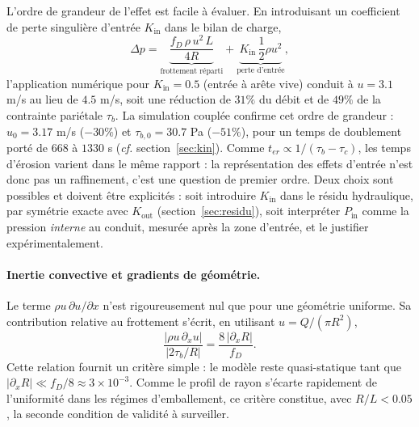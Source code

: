 \documentclass[11pt,a4paper]{report}
\newcommand{\kout}{K_{\mathrm{out}}}
\newcommand{\kin}{K_{\mathrm{in}}}
\newcommand{\ter}{{t_{er}}}
\begin{document}
L'ordre de grandeur de l'effet est facile à évaluer. En introduisant un coefficient de perte singulière
d'entrée \(\kin\) dans le bilan de charge,
\begin{equation}
\Delta p = \underbrace{\frac{f_D\,\rho\,u^2\,L}{4R}}_{\text{frottement réparti}}
+ \underbrace{\kin\,\frac{1}{2}\rho u^2}_{\text{perte d'entrée}},
\label{eq:charge-entree}
\end{equation}
l'application numérique pour \(\kin = 0.5\) (entrée à arête vive) conduit à \(u = 3.1\) m/s au lieu de
\(4.5\) m/s, soit une réduction de \(31\%\) du débit et de \(49\%\) de la contrainte pariétale
\(\tau_b\). La simulation couplée confirme cet ordre de grandeur : \(u_0 = 3.17\) m/s
(\(-30\%\)) et \(\tau_{b,0} = 30.7\) Pa (\(-51\%\)), pour un temps de doublement porté de \(668\) à
\(1330\) s (\emph{cf.} section~\ref{sec:kin}). Comme \(\ter \propto 1/(\tau_b-\tau_c)\), les temps d'érosion varient dans le même rapport :
la représentation des effets d'entrée n'est donc pas un raffinement, c'est une question de premier
ordre. Deux choix sont possibles et doivent être explicités : soit introduire \(\kin\) dans le résidu
hydraulique, par symétrie exacte avec \(\kout\) (section~\ref{sec:residu}), soit interpréter
\(P_{\mathrm{in}}\) comme la pression \emph{interne} au conduit, mesurée après la zone d'entrée, et le
justifier expérimentalement.

\paragraph{Inertie convective et gradients de géométrie.} Le terme \(\rho u\,\partial u/\partial x\)
n'est rigoureusement nul que pour une géométrie uniforme. Sa contribution relative au frottement
s'écrit, en utilisant \(u = Q/(\pi R^2)\),
\begin{equation}
\frac{\left|\rho u\,\partial_x u\right|}{\left|2\tau_b/R\right|}
= \frac{8\,|\partial_x R|}{f_D}.
\label{eq:inertie-frottement}
\end{equation}
Cette relation fournit un critère simple : le modèle reste quasi-statique tant que
\(|\partial_x R| \ll f_D/8 \approx 3\times10^{-3}\). Comme le profil de rayon s'écarte rapidement de
l'uniformité dans les régimes d'emballement, ce critère constitue, avec \(R/L < 0.05\), la seconde
condition de validité à surveiller.
\end{document}

